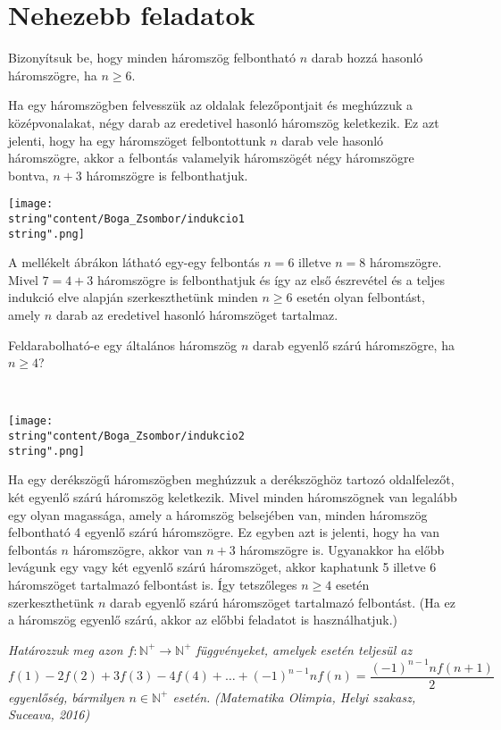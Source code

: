 \section*{Nehezebb feladatok}
\begin{extraproblem}
Bizonyítsuk be, hogy minden háromszög felbontható $n$ darab hozzá
hasonló háromszögre, ha $n\geq6$. 
\end{extraproblem}

\begin{solution}
Ha egy háromszögben felvesszük az oldalak felezőpontjait és meghúzzuk
a középvonalakat, négy darab az eredetivel hasonló háromszög keletkezik.
Ez azt jelenti, hogy ha egy háromszöget felbontottunk $n$ darab vele
hasonló háromszögre, akkor a felbontás valamelyik háromszögét négy
háromszögre bontva, $n+3$ háromszögre is felbonthatjuk.
\begin{center}
\texttt{[image: \\string"content/Boga\_Zsombor/indukcio1\\string".png]} 
\par\end{center}
A mellékelt ábrákon látható egy-egy felbontás $n=6$ illetve $n=8$
háromszögre. Mivel $7=4+3$ háromszögre is felbonthatjuk és így az
első észrevétel és a teljes indukció elve alapján szerkeszthetünk
minden $n\geq6$ esetén olyan felbontást, amely $n$ darab az eredetivel
hasonló háromszöget tartalmaz.
\end{solution}
\begin{extraproblem}
Feldarabolható-e egy általános háromszög $n$ darab egyenlő szárú
háromszögre, ha $n\geq4$? 
\end{extraproblem}

\begin{solution}
~
\begin{center}
\texttt{[image: \\string"content/Boga\_Zsombor/indukcio2\\string".png]} 
\par\end{center}
Ha egy derékszögű háromszögben meghúzzuk a derékszöghöz tartozó oldalfelezőt,
két egyenlő szárú háromszög keletkezik. Mivel minden háromszögnek
van legalább egy olyan magassága, amely a háromszög belsejében van,
minden háromszög felbontható 4 egyenlő szárú háromszögre. Ez egyben
azt is jelenti, hogy ha van felbontás $n$ háromszögre, akkor van
$n+3$ háromszögre is. Ugyanakkor ha előbb levágunk egy vagy két egyenlő
szárú háromszöget, akkor kaphatunk 5 illetve 6 háromszöget tartalmazó
felbontást is. Így tetszőleges $n\geq4$ esetén szerkeszthetünk $n$
darab egyenlő szárú háromszöget tartalmazó felbontást. (Ha ez a háromszög
egyenlő szárú, akkor az előbbi feladatot is használhatjuk.) 
\end{solution}
\begin{extraproblem}
\textit{\emph{Határozzuk meg azon $f:\mathbb{N}^{+}\to\mathbb{N}^{+}$
függvényeket, amelyek esetén teljesül az}}\emph{ 
\[
f(1)-2f(2)+3f(3)-4f(4)+\dots+(-1)^{n-1}nf(n)=\frac{(-1)^{n-1}nf(n+1)}{2}
\]
}\textit{\emph{egyenlőség, bármilyen $n\in\mathbb{N}^{+}$ esetén.
}}\textit{(Matematika Olimpia, Helyi szakasz, Suceava, 2016)}
\end{extraproblem}

